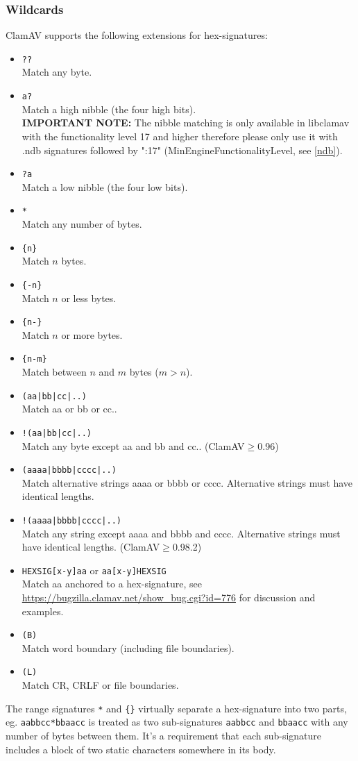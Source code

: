 \documentclass[a4paper,titlepage,12pt]{article}
\begin{document}
    \subsubsection{Wildcards}
    ClamAV supports the following extensions for hex-signatures:
    \begin{itemize}
	\item \verb+??+\\
	Match any byte.
	\item \verb+a?+\\
	Match a high nibble (the four high bits).\\ \textbf{IMPORTANT NOTE:}
	The nibble matching is only available in libclamav with the
	functionality level 17 and higher therefore please only use it with
	.ndb signatures followed by ":17" (MinEngineFunctionalityLevel,
	see \ref{ndb}).
	\item \verb+?a+\\
	Match a low nibble (the four low bits).
	\item \verb+*+\\
	Match any number of bytes.
	\item \verb+{n}+\\
	Match $n$ bytes.
	\item \verb+{-n}+\\
	Match $n$ or less bytes.
	\item \verb+{n-}+\\
	Match $n$ or more bytes.
	\item \verb+{n-m}+\\
	Match between $n$ and $m$ bytes ($m > n$).
	\item \verb+(aa|bb|cc|..)+\\
	Match aa or bb or cc..
	\item \verb+!(aa|bb|cc|..)+\\
	Match any byte except aa and bb and cc.. (ClamAV$\ge$0.96)
	\item \verb+(aaaa|bbbb|cccc|..)+\\
	Match alternative strings aaaa or bbbb or cccc. Alternative strings must have identical lengths.
	\item \verb+!(aaaa|bbbb|cccc|..)+\\
	Match any string except aaaa and bbbb and cccc. Alternative strings must have identical lengths.
        (ClamAV$\ge$0.98.2)
	\item \verb+HEXSIG[x-y]aa+ or \verb+aa[x-y]HEXSIG+\\
	Match aa anchored to a hex-signature, see
	\url{https://bugzilla.clamav.net/show_bug.cgi?id=776} for
	discussion and examples.
	\item \verb+(B)+\\
	Match word boundary (including file boundaries).
	\item \verb+(L)+\\
	Match CR, CRLF or file boundaries.
    \end{itemize}
    The range signatures \verb+*+ and \verb+{}+ virtually separate
    a hex-signature into two parts, eg. \verb+aabbcc*bbaacc+ is treated
    as two sub-signatures \verb+aabbcc+ and \verb+bbaacc+ with any number
    of bytes between them. It's a requirement that each sub-signature
    includes a block of two static characters somewhere in its body.
\end{document}
